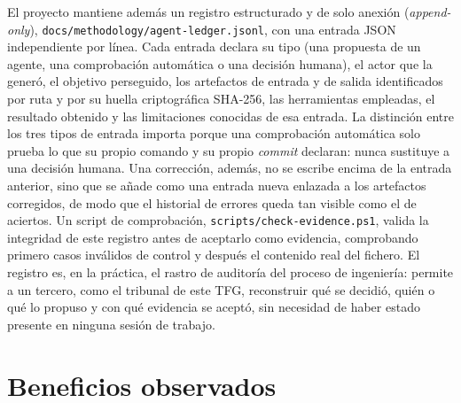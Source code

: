 El proyecto mantiene además un registro estructurado y de solo anexión (\textit{append-only}),
\texttt{docs/methodology/agent-ledger.jsonl}, con una entrada JSON independiente por línea. Cada
entrada declara su tipo (una propuesta de un agente, una comprobación automática o una decisión
humana), el actor que la generó, el objetivo perseguido, los artefactos de entrada y de salida
identificados por ruta y por su huella criptográfica SHA-256, las herramientas empleadas, el
resultado obtenido y las limitaciones conocidas de esa entrada. La distinción entre los tres
tipos de entrada importa porque una comprobación automática solo prueba lo que su propio
comando y su propio \textit{commit} declaran: nunca sustituye a una decisión humana. Una
corrección, además, no se escribe encima de la entrada anterior, sino que se añade como una
entrada nueva enlazada a los artefactos corregidos, de modo que el historial de errores queda
tan visible como el de aciertos. Un script de comprobación, \texttt{scripts/check-evidence.ps1},
valida la integridad de este registro antes de aceptarlo como evidencia, comprobando primero
casos inválidos de control y después el contenido real del fichero. El registro es, en la
práctica, el rastro de auditoría del proceso de ingeniería: permite a un tercero, como el
tribunal de este TFG, reconstruir qué se decidió, quién o qué lo propuso y con qué evidencia se
aceptó, sin necesidad de haber estado presente en ninguna sesión de trabajo.

\section{Beneficios observados}\label{sec:gestion-beneficios}

